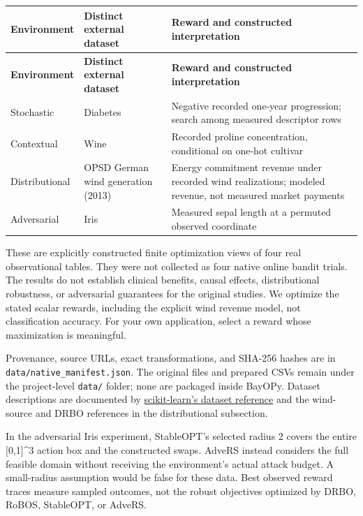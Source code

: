 \documentclass[10pt,a4paper]{article}
\begin{document}
{\small
\begin{longtable}{@{}>{\raggedright\arraybackslash}p{0.1800\dimexpr\linewidth-4\tabcolsep\relax}>{\raggedright\arraybackslash}p{0.3500\dimexpr\linewidth-4\tabcolsep\relax}>{\raggedright\arraybackslash}p{0.4700\dimexpr\linewidth-4\tabcolsep\relax}@{}}
\toprule
\textbf{Environment} & \textbf{Distinct external dataset} & \textbf{Reward and constructed interpretation} \\
\midrule\endfirsthead
\toprule
\textbf{Environment} & \textbf{Distinct external dataset} & \textbf{Reward and constructed interpretation} \\
\midrule\endhead
Stochastic & Diabetes & Negative recorded one-year progression; search among measured descriptor rows \\
Contextual & Wine & Recorded proline concentration,\allowbreak{} conditional on one-hot cultivar \\
Distributional & OPSD German wind generation (2013) & Energy commitment revenue under recorded wind realizations; modeled revenue,\allowbreak{} not measured market payments \\
Adversarial & Iris & Measured sepal length at a permuted observed coordinate \\
\bottomrule
\end{longtable}
}

These are explicitly constructed finite optimization views of four real observational tables. They were not collected as four native online bandit trials. The results do not establish clinical benefits,\allowbreak{} causal effects,\allowbreak{} distributional robustness,\allowbreak{} or adversarial guarantees for the original studies. We optimize the stated scalar rewards,\allowbreak{} including the explicit wind revenue model,\allowbreak{} not classification accuracy. For your own application,\allowbreak{} select a reward whose maximization is meaningful.


Provenance,\allowbreak{} source URLs,\allowbreak{} exact transformations,\allowbreak{} and SHA-256 hashes are in \texttt{data/\allowbreak{}native\_\allowbreak{}manifest.\allowbreak{}json}. The original files and prepared CSVs remain under the project-level \texttt{data/\allowbreak{}} folder; none are packaged inside BayOPy. Dataset descriptions are documented by \href{https://scikit-learn.org/1.6/datasets/toy_dataset.html}{scikit-learn's dataset reference} and the wind-source and DRBO references in the distributional subsection.


In the adversarial Iris experiment,\allowbreak{} StableOPT's selected radius 2 covers the entire [0,\allowbreak{}1]\textasciicircum{}3 action box and the constructed swaps. AdveRS instead considers the full feasible domain without receiving the environment's actual attack budget. A small-radius assumption would be false for these data. Best observed reward traces measure sampled outcomes,\allowbreak{} not the robust objectives optimized by DRBO,\allowbreak{} RoBOS,\allowbreak{} StableOPT,\allowbreak{} or AdveRS.
\end{document}

